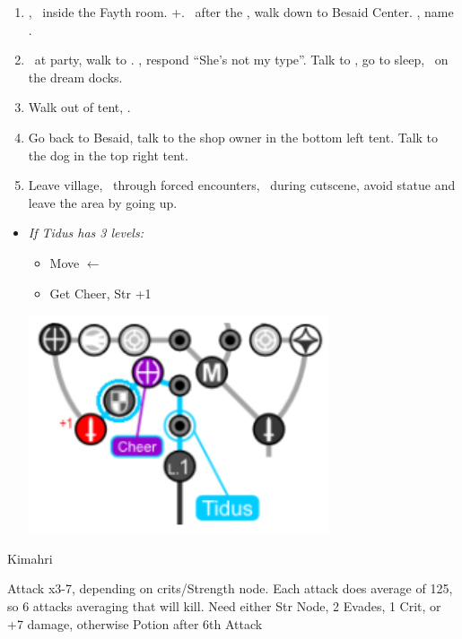 \begin{enumerate}[resume]
  \item \cs[1:00], \sd\ inside the Fayth room. \fmv+\cs[1:00]. \sd\ after the \fmv, walk down to Besaid Center. \cs[1:40], name \valefor.
  \item \sd\ at party, walk to \yuna. \sd, respond ``She's not my type''. Talk to \wakka, go to sleep, \sd\ on the dream docks.
  \item Walk out of tent, \sd.
  \item Go back to Besaid, talk to the shop owner in the bottom left tent. Talk to the dog in the top right tent.
  \item Leave village, \sd\ through forced encounters, \sd\ during cutscene, avoid statue and leave the area by going up.
\end{enumerate}
\begin{spheregrid}
  \begin{itemize}
    \item \textit{If Tidus has 3 levels:}
          \begin{itemize}
            \item Move $\leftarrow$
            \item Get Cheer, Str +1
          \end{itemize}
          \includegraphics{graphics/tiduscheer}
  \end{itemize}
\end{spheregrid}
\begin{battle}[750]{Kimahri}
  \begin{itemize}
    \tidusf Attack x3-7, depending on crits/Strength node.
    \tidusf Each attack does average of 125, so 6 attacks averaging that will kill.
    \tidusf Need either Str Node, 2 Evades, 1 Crit, or +7 damage, otherwise Potion after 6th Attack
  \end{itemize}
\end{battle}
